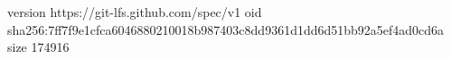 version https://git-lfs.github.com/spec/v1
oid sha256:7ff7f9e1cfca6046880210018b987403c8dd9361d1dd6d51bb92a5ef4ad0cd6a
size 174916

